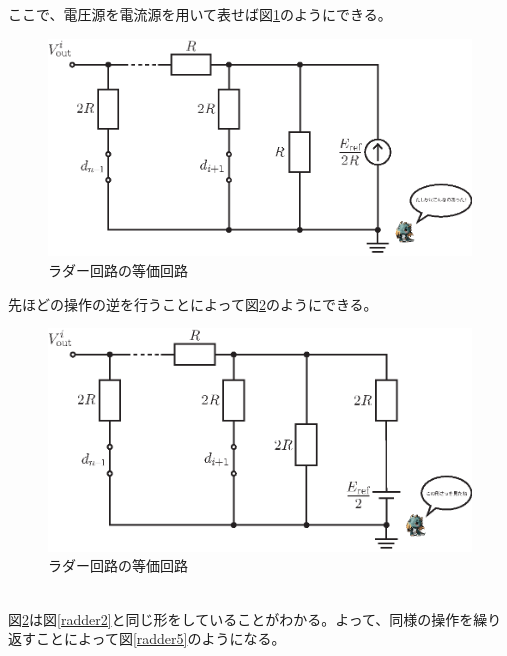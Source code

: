 \documentclass[a4paper,10.5pt]{ltjsarticle}
\begin{document}
ここで、電圧源を電流源を用いて表せば図\ref{radder3}のようにできる。
\clearpage
\begin{figure}[h]
  \centering
  \includegraphics{figure3.eps}
  \vspace{-40pt}\caption{ラダー回路の等価回路}
  \label{radder3}
\end{figure}
先ほどの操作の逆を行うことによって図\ref{radder4}のようにできる。
\begin{figure}[h]
  \centering
  \includegraphics{figure4.eps}
  \vspace{-40pt}\caption{ラダー回路の等価回路}
  \label{radder4}
\end{figure}\\
図\ref{radder4}は図\ref{radder2}と同じ形をしていることがわかる。よって、同様の操作を繰り返すことによって図\ref{radder5}のようになる。
\clearpage
\end{document}
